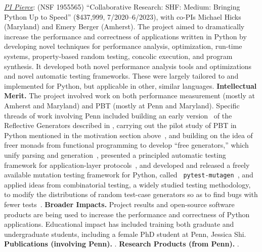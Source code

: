 

\emph{\underline{PI Pierce}}: (NSF 1955565) ``Collaborative Research:
SHF: Medium: Bringing Python Up to Speed'' (\$437,999,
7/2020--6/2023), with co-PIs Michael Hicks (Maryland) and Emery Berger
(Amherst).
The project aimed to dramatically increase the performance and
correctness of applications written in Python by developing novel
techniques for performance analysis, optimization, run-time systems,
property-based random testing, concolic execution, and program
synthesis. It developed both
novel performance analysis tools and optimizations and novel automatic
testing frameworks. These were largely tailored to and implemented for
Python, but applicable in other, similar languages.
%
{\bf Intellectual Merit.} The project involved work on both
performance measurement (mostly at Amherst and Maryland) and PBT (mostly at Penn
and Maryland).  Specific threads of work involving Penn included
building an early
version~\cite{Frohlich2022} of the Reflective Generators described in
, carrying out the pilot study of PBT in Python
mentioned in the motivation section
above~\cite{goldstein_problems_2022}, and building on the idea of
freer monads from functional programming to develop ``free
generators,'' which unify parsing and
generation~\cite{goldstein2022parsing}, presented a principled
automatic testing framework for application-layer
protocols~\cite{Li2021:MBToNA}, and developed and released a freely
available mutation testing framework for Python, called {\tt
  pytest-mutagen}~\cite{pytestmutagen}, and applied ideas from
combinatorial testing, a widely studied testing methodology, to modify
the distributions of random test-case generators so as to find bugs
with fewer tests~\cite{DBLP:conf/esop/GoldsteinHLP21}.
%
{\bf Broader Impacts.} Project results and open-source software
products are being used to increase the
performance and correctness of Python applications.
Educational impact has included training both graduate and
undergraduate students, including a female PhD student at Penn, Jessica
Shi.
%
{\bf Publications (involving Penn).} \cite{Frohlich2022,DBLP:conf/esop/GoldsteinHLP21,
  goldstein2022parsing, goldstein_problems_2022, Li2021:MBToNA}.
{\bf Research Products (from Penn).} \cite{pytestmutagen}.

